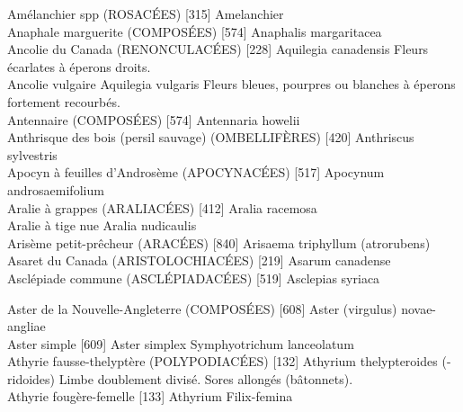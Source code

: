 \documentclass[book,12pt,a4paper,onecolumn,openany]{memoir}
\begin{document}
Amélanchier spp (ROSACÉES)  [315]				
				Amelanchier\\

Anaphale marguerite (COMPOSÉES)  [574]
				Anaphalis margaritacea\\

Ancolie du Canada (RENONCULACÉES)  [228]
				Aquilegia canadensis
Fleurs écarlates à éperons droits.\\


Ancolie vulgaire
				Aquilegia vulgaris
Fleurs bleues, pourpres ou blanches à éperons fortement recourbés.\\


Antennaire (COMPOSÉES)  [574]
				Antennaria howelii\\
				


Anthrisque des bois (persil sauvage) (OMBELLIFÈRES)  [420]
				Anthriscus sylvestris\\
				

Apocyn à feuilles d’Androsème (APOCYNACÉES)  [517]
				Apocynum androsaemifolium\\


Aralie à grappes (ARALIACÉES)  [412]
				Aralia racemosa\\


Aralie à tige nue
				Aralia nudicaulis\\


Arisème petit-prêcheur (ARACÉES)  [840]					
				Arisaema triphyllum (atrorubens)\\


Asaret du Canada (ARISTOLOCHIACÉES)  [219]			
				Asarum canadense\\			


Asclépiade commune (ASCLÉPIADACÉES)  [519]
				Asclepias syriaca\\
\newpage

Aster de la Nouvelle-Angleterre (COMPOSÉES)  [608]
				Aster (virgulus)  novae-angliae\\

Aster simple  [609]
				Aster simplex
				Symphyotrichum lanceolatum\\

Athyrie fausse-thelyptère (POLYPODIACÉES)  [132]
				Athyrium thelypteroides (-ridoides)
Limbe doublement divisé. Sores allongés (bâtonnets).\\

Athyrie fougère-femelle  [133]
				Athyrium Filix-femina\\
\end{document}
